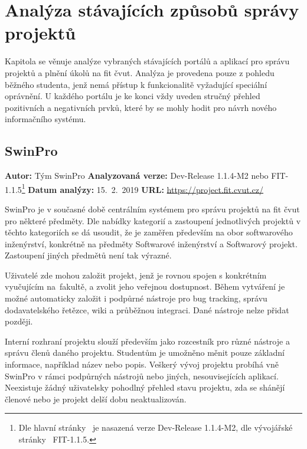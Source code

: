 \chapter{Analýza stávajících způsobů správy projektů}

Kapitola se věnuje analýze vybraných stávajících portálů a aplikací pro správu projektů a plnění úkolů na \gls{fit} \gls{čvut}. Analýza je provedena pouze z pohledu běžného studenta, jenž nemá přístup k funkcionalitě vyžadující speciální oprávnění. U každého portálu je ke konci vždy uveden stručný přehled pozitivních a negativních prvků, které by se mohly hodit pro návrh nového informačního systému.




\section{SwinPro}

\textbf{Autor:} Tým SwinPro\newline
\textbf{Analyzovaná verze:} Dev-Release 1.1.4-M2 nebo FIT-1.1.5\footnote{Dle hlavní stránky~\cite{swinproHome} je nasazená verze Dev-Release 1.1.4-M2, dle vývojářské stránky~\cite{swinproDevpage} FIT-1.1.5.}\newline
\textbf{Datum analýzy:} 15.~2.~2019\newline
\textbf{URL:} \url{https://project.fit.cvut.cz/}

SwinPro je v současné době centrálním systémem pro správu projektů na \gls{fit} \gls{čvut} pro některé předměty. Dle nabídky kategorií a zastoupení jednotlivých projektů v těchto kategoriích se dá usoudit, že je zaměřen především na obor softwarového inženýrství, konkrétně na předměty Softwarové inženýrství a Softwarový projekt. Zastoupení jiných předmětů není tak výrazné.

Uživatelé zde mohou založit projekt, jenž je rovnou spojen s konkrétním vyučujícím na~fakultě, a zvolit jeho veřejnou dostupnost. Během vytváření je možné automaticky založit i podpůrné nástroje pro bug tracking, správu dodavatelského řetězce, wiki a průběžnou integraci. Dané nástroje nelze přidat později.

Interní rozhraní projektu slouží především jako rozcestník pro různé nástroje a správu členů daného projektu. Studentům je umožněno měnit pouze základní informace, například název nebo popis. Veškerý vývoj projektu probíhá vně SwinPro v rámci podpůrných nástrojů nebo jiných, nesouvisejících aplikací. Neexistuje žádný uživatelsky pohodlný přehled stavu projektu, zda se shánějí členové nebo je projekt delší dobu neaktualizován.

